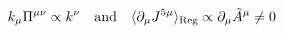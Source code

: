 \begin{equation}
k_\mu \Pi^{\mu\nu} \propto k^\nu \quad {\rm and} \quad \langle
\partial_\mu J^{5\mu}\rangle_{\rm Reg} \propto \partial_\mu
{\tilde A}^\mu \neq 0
\end{equation}

